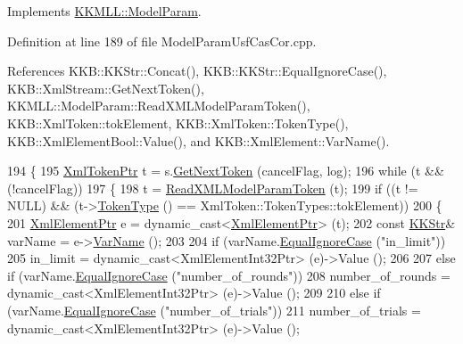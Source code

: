 Implements \hyperlink{class_k_k_m_l_l_1_1_model_param_a671c3ef465614d548e3730ca0427eb67}{K\+K\+M\+L\+L\+::\+Model\+Param}.



Definition at line 189 of file Model\+Param\+Usf\+Cas\+Cor.\+cpp.



References K\+K\+B\+::\+K\+K\+Str\+::\+Concat(), K\+K\+B\+::\+K\+K\+Str\+::\+Equal\+Ignore\+Case(), K\+K\+B\+::\+Xml\+Stream\+::\+Get\+Next\+Token(), K\+K\+M\+L\+L\+::\+Model\+Param\+::\+Read\+X\+M\+L\+Model\+Param\+Token(), K\+K\+B\+::\+Xml\+Token\+::tok\+Element, K\+K\+B\+::\+Xml\+Token\+::\+Token\+Type(), K\+K\+B\+::\+Xml\+Element\+Bool\+::\+Value(), and K\+K\+B\+::\+Xml\+Element\+::\+Var\+Name().


\begin{DoxyCode}
194 \{
195   \hyperlink{class_k_k_b_1_1_xml_token}{XmlTokenPtr}  t = s.\hyperlink{class_k_k_b_1_1_xml_stream_a87cc738b05c666cf5d5c25beaab477b4}{GetNextToken} (cancelFlag, log);
196   \textcolor{keywordflow}{while}  (t  &&  (!cancelFlag))
197   \{
198     t = \hyperlink{class_k_k_m_l_l_1_1_model_param_a6d51128c4b26cb4c432091dc2e21415d}{ReadXMLModelParamToken} (t);
199     \textcolor{keywordflow}{if}  ((t != NULL)  &&  (t->\hyperlink{class_k_k_b_1_1_xml_token_ae98e2c1a798882647578cae4adcd7176}{TokenType} () == XmlToken::TokenTypes::tokElement))
200     \{
201       \hyperlink{class_k_k_b_1_1_xml_element}{XmlElementPtr} e = \textcolor{keyword}{dynamic\_cast<}\hyperlink{class_k_k_b_1_1_xml_element}{XmlElementPtr}\textcolor{keyword}{>} (t);
202       \textcolor{keyword}{const} \hyperlink{class_k_k_b_1_1_k_k_str}{KKStr}&  varName = e->\hyperlink{class_k_k_b_1_1_xml_element_aef57cf00be66a3a387ce849b35125f51}{VarName} ();
203 
204       \textcolor{keywordflow}{if}  (varName.\hyperlink{class_k_k_b_1_1_k_k_str_a562f9696417c53f66bc4088eac072ab5}{EqualIgnoreCase} (\textcolor{stringliteral}{"in\_limit"}))
205         in\_limit =  dynamic\_cast<XmlElementInt32Ptr> (e)->Value ();
206 
207       \textcolor{keywordflow}{else} \textcolor{keywordflow}{if}  (varName.\hyperlink{class_k_k_b_1_1_k_k_str_a562f9696417c53f66bc4088eac072ab5}{EqualIgnoreCase} (\textcolor{stringliteral}{"number\_of\_rounds"}))
208         number\_of\_rounds =  dynamic\_cast<XmlElementInt32Ptr> (e)->Value ();
209 
210       \textcolor{keywordflow}{else} \textcolor{keywordflow}{if}  (varName.\hyperlink{class_k_k_b_1_1_k_k_str_a562f9696417c53f66bc4088eac072ab5}{EqualIgnoreCase} (\textcolor{stringliteral}{"number\_of\_trials"}))
211         number\_of\_trials =  dynamic\_cast<XmlElementInt32Ptr> (e)->Value ();

\end{DoxyCode}
